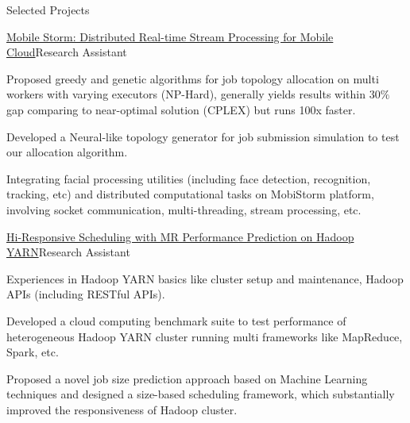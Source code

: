 \documentclass{resume} %
\begin{document}
\begin{rSection}{Selected Projects}
\begin{rSubsection}{\href{http://ieeexplore.ieee.org/document/7335296/?arnumber=7335296}{Mobile Storm: Distributed Real-time Stream Processing for Mobile Cloud}}{Research Assistant}{}{}
\item Proposed greedy and genetic algorithms for job topology allocation on multi workers with varying executors (NP-Hard), generally yields results within $30\%$ gap comparing to near-optimal solution (CPLEX) but runs 100x faster.
\item Developed a Neural-like topology generator for job submission simulation to test our allocation algorithm.
\item Integrating facial processing utilities (including face detection, recognition, tracking, etc) and distributed computational tasks on MobiStorm platform, involving socket communication, multi-threading, stream processing, etc.

\end{rSubsection}

\begin{rSubsection}{\href{http://ieeexplore.ieee.org/document/7579961/}{Hi-Responsive Scheduling with MR Performance Prediction on Hadoop YARN}}{Research Assistant}{}{}
\item Experiences in Hadoop YARN basics like cluster setup and maintenance, Hadoop APIs (including RESTful APIs).
\item Developed a cloud computing benchmark suite to test performance of heterogeneous Hadoop YARN cluster running multi frameworks like MapReduce, Spark, etc.
\item Proposed a novel job size prediction approach based on Machine Learning techniques and designed a size-based scheduling framework, which substantially improved the responsiveness of Hadoop cluster.

\end{rSubsection}





\end{rSection}
\end{document}

